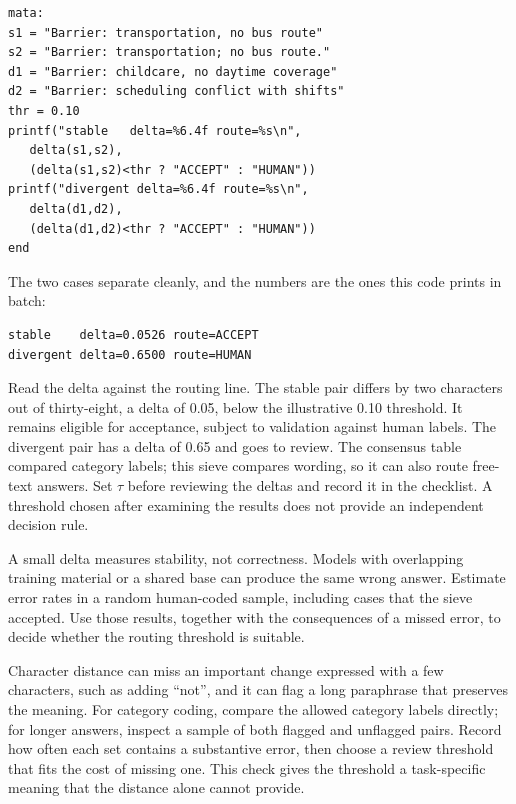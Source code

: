 \documentclass[
    a4paper,
    fontsize=10pt,
    twoside=true,
    numbers=noenddot,
]{kaobook}
\begin{document}
\par
{\footnotesize
\begin{verbatim}
mata:
s1 = "Barrier: transportation, no bus route"
s2 = "Barrier: transportation; no bus route."
d1 = "Barrier: childcare, no daytime coverage"
d2 = "Barrier: scheduling conflict with shifts"
thr = 0.10
printf("stable   delta=%6.4f route=%s\n",
   delta(s1,s2),
   (delta(s1,s2)<thr ? "ACCEPT" : "HUMAN"))
printf("divergent delta=%6.4f route=%s\n",
   delta(d1,d2),
   (delta(d1,d2)<thr ? "ACCEPT" : "HUMAN"))
end
\end{verbatim}
}
The two cases separate cleanly, and the numbers are the ones this code prints in batch:
\par
{\footnotesize
\begin{verbatim}
stable    delta=0.0526 route=ACCEPT
divergent delta=0.6500 route=HUMAN
\end{verbatim}
}
Read the delta against the routing line. The stable pair differs by two characters out of thirty-eight, a delta of 0.05, below the illustrative 0.10 threshold. It remains eligible for acceptance, subject to validation against human labels. The divergent pair has a delta of 0.65 and goes to review. The consensus table compared category labels; this sieve compares wording, so it can also route free-text answers. Set $\tau$ before reviewing the deltas and record it in the checklist. A threshold chosen after examining the results does not provide an independent decision rule.

A small delta measures stability, not correctness. Models with overlapping training material or a shared base can produce the same wrong answer. Estimate error rates in a random human-coded sample, including cases that the sieve accepted. Use those results, together with the consequences of a missed error, to decide whether the routing threshold is suitable.

Character distance can miss an important change expressed with a few characters, such as adding \enquote{not}, and it can flag a long paraphrase that preserves the meaning. For category coding, compare the allowed category labels directly; for longer answers, inspect a sample of both flagged and unflagged pairs. Record how often each set contains a substantive error, then choose a review threshold that fits the cost of missing one. This check gives the threshold a task-specific meaning that the distance alone cannot provide.
\end{document}
